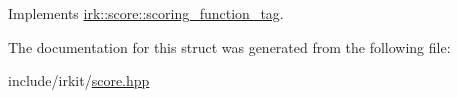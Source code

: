 Implements \mbox{\hyperlink{structirk_1_1score_1_1scoring__function__tag_a718047dd6d5a9edd7b76ec55f2599c49}{irk\+::score\+::scoring\+\_\+function\+\_\+tag}}.



The documentation for this struct was generated from the following file\+:\begin{DoxyCompactItemize}
\item 
include/irkit/\mbox{\hyperlink{score_8hpp}{score.\+hpp}}\end{DoxyCompactItemize}
